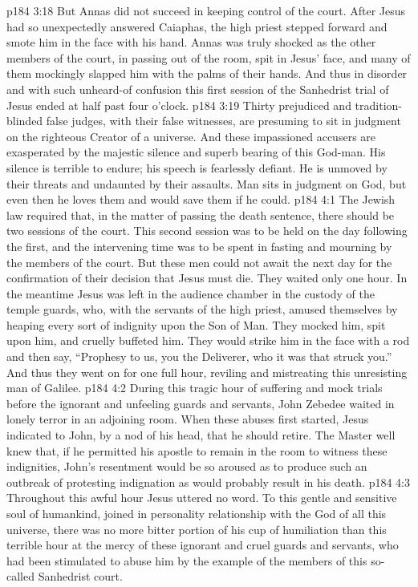 \vs p184 3:18 But Annas did not succeed in keeping control of the court. After Jesus had so unexpectedly answered Caiaphas, the high priest stepped forward and smote him in the face with his hand. Annas was truly shocked as the other members of the court, in passing out of the room, spit in Jesus’ face, and many of them mockingly slapped him with the palms of their hands. And thus in disorder and with such unheard\hyp{}of confusion this first session of the Sanhedrist trial of Jesus ended at half past four o’clock.
\pc \vs p184 3:19 Thirty prejudiced and tradition\hyp{}blinded false judges, with their false witnesses, are presuming to sit in judgment on the righteous Creator of a universe. And these impassioned accusers are exasperated by the majestic silence and superb bearing of this God\hyp{}man. His silence is terrible to endure; his speech is fearlessly defiant. He is unmoved by their threats and undaunted by their assaults. Man sits in judgment on God, but even then he loves them and would save them if he could.
\vs p184 4:1 The Jewish law required that, in the matter of passing the death sentence, there should be two sessions of the court. This second session was to be held on the day following the first, and the intervening time was to be spent in fasting and mourning by the members of the court. But these men could not await the next day for the confirmation of their decision that Jesus must die. They waited only one hour. In the meantime Jesus was left in the audience chamber in the custody of the temple guards, who, with the servants of the high priest, amused themselves by heaping every sort of indignity upon the Son of Man. They mocked him, spit upon him, and cruelly buffeted him. They would strike him in the face with a rod and then say, “Prophesy to us, you the Deliverer, who it was that struck you.” And thus they went on for one full hour, reviling and mistreating this unresisting man of Galilee.
\vs p184 4:2 During this tragic hour of suffering and mock trials before the ignorant and unfeeling guards and servants, John Zebedee waited in lonely terror in an adjoining room. When these abuses first started, Jesus indicated to John, by a nod of his head, that he should retire. The Master well knew that, if he permitted his apostle to remain in the room to witness these indignities, John’s resentment would be so aroused as to produce such an outbreak of protesting indignation as would probably result in his death.
\vs p184 4:3 Throughout this awful hour Jesus uttered no word. To this gentle and sensitive soul of humankind, joined in personality relationship with the God of all this universe, there was no more bitter portion of his cup of humiliation than this terrible hour at the mercy of these ignorant and cruel guards and servants, who had been stimulated to abuse him by the example of the members of this so\hyp{}called Sanhedrist court.
